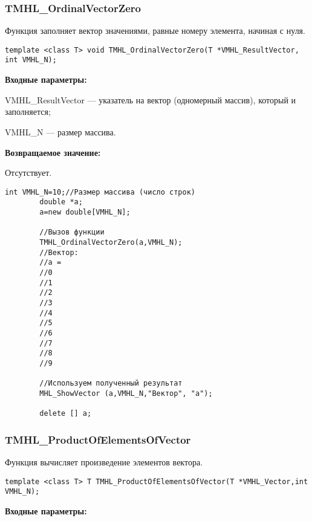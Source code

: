 \documentclass[a4paper,12pt]{article}
\begin{document}
\subsubsection{TMHL\_OrdinalVectorZero}\label{TMHL_OrdinalVectorZero}

Функция заполняет вектор значениями, равные номеру элемента, начиная с нуля.


\begin{lstlisting}[label=code_syntax_TMHL_OrdinalVectorZero,caption=Синтаксис]
template <class T> void TMHL_OrdinalVectorZero(T *VMHL_ResultVector, int VMHL_N);
\end{lstlisting}

\textbf{Входные параметры:}

 VMHL\_ResultVector --- указатель на вектор (одномерный массив), который и заполняется;
 
 VMHL\_N --- размер массива.

\textbf{Возвращаемое значение:}

Отсутствует.


\begin{lstlisting}[label=code_use_TMHL_OrdinalVectorZero,caption=Пример использования]
        int VMHL_N=10;//Размер массива (число строк)
        double *a;
        a=new double[VMHL_N];

        //Вызов функции
        TMHL_OrdinalVectorZero(a,VMHL_N);
        //Вектор:
        //a =
        //0
        //1
        //2
        //3
        //4
        //5
        //6
        //7
        //8
        //9

        //Используем полученный результат
        MHL_ShowVector (a,VMHL_N,"Вектор", "a");

        delete [] a;
\end{lstlisting}

\subsubsection{TMHL\_ProductOfElementsOfVector}\label{TMHL_ProductOfElementsOfVector}

Функция вычисляет произведение элементов вектора.


\begin{lstlisting}[label=code_syntax_TMHL_ProductOfElementsOfVector,caption=Синтаксис]
template <class T> T TMHL_ProductOfElementsOfVector(T *VMHL_Vector,int VMHL_N);
\end{lstlisting}

\textbf{Входные параметры:}
\end{document}
